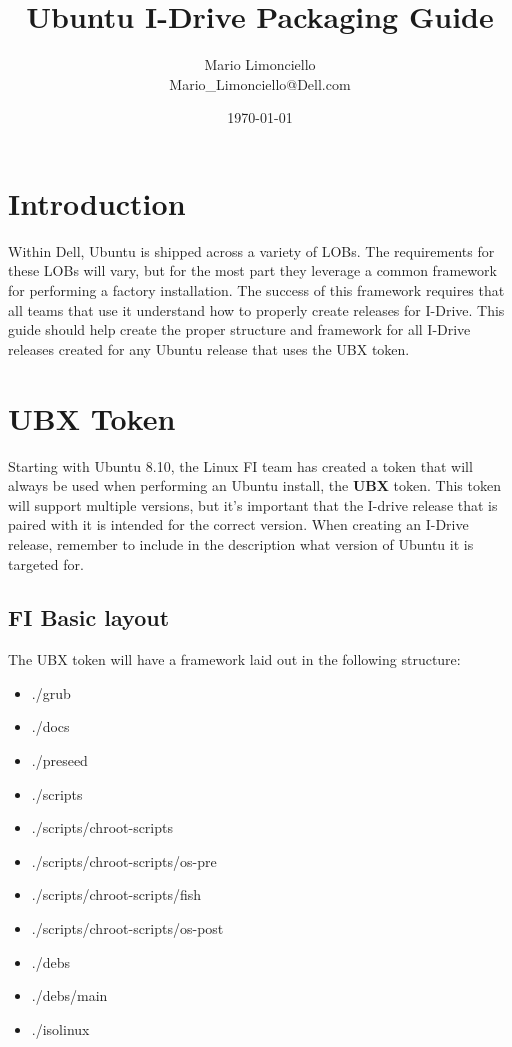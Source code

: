 \documentclass[letterpaper,10pt,titlepage]{article}
\title{\textbf{Ubuntu I-Drive Packaging Guide}}
\author{Mario Limonciello\\ Mario\_Limonciello@Dell.com}
\date{\today}
\begin{document}
\maketitle

\tableofcontents
\newpage

\section{Introduction}
Within Dell, Ubuntu is shipped across a variety of LOBs.  The requirements for these LOBs will vary, but for the most part they leverage a common framework for performing a factory installation.  The success of this framework requires that all teams that use it understand how to properly create releases for I-Drive.  This guide should help create the proper structure and framework for all I-Drive releases created for any Ubuntu release that uses the UBX token.

\section{UBX Token}
Starting with Ubuntu 8.10, the Linux FI team has created a token that will always be used when performing an Ubuntu install, the \textbf{UBX} token.  This token will support multiple versions, but it's important that the I-drive release that is paired with it is intended for the correct version.  When creating an I-Drive release, remember to include in the description what version of Ubuntu it is targeted for.

\subsection{FI Basic layout}
The UBX token will have a framework laid out in the following structure:
\begin{itemize}
\item ./grub
\item ./docs
\item ./preseed
\item ./scripts
\item ./scripts/chroot-scripts
\item ./scripts/chroot-scripts/os-pre
\item ./scripts/chroot-scripts/fish
\item ./scripts/chroot-scripts/os-post
\item ./debs
\item ./debs/main
\item ./isolinux
\end{itemize}
\end{document}
